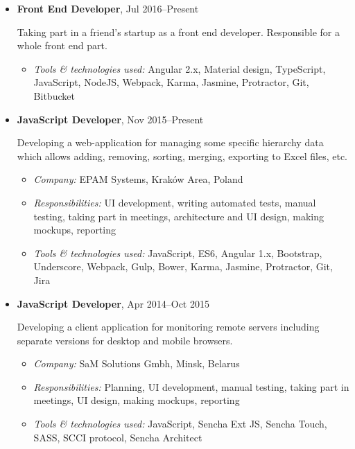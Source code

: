 \documentclass[a4paper, 12pt]{article}
\newcommand{\position}[1]{
    \textbf{#1}}
\newcommand{\itemlabel}[1]{
    \textit{#1:}}
\begin{document}
    \begin{itemize}

        \item \position{Front End Developer}, Jul 2016--Present

            Taking part in a friend's startup as a front end developer. Responsible for a whole front end part.

            \begin{itemize}
                \item \itemlabel{Tools \& technologies used} Angular 2.x, Material design, TypeScript, JavaScript, NodeJS, Webpack, Karma, Jasmine, Protractor, Git, Bitbucket
            \end{itemize}

        \item \position{JavaScript Developer}, Nov 2015--Present

            Developing a web-application for managing some specific hierarchy data which allows adding, removing, sorting, merging, exporting to Excel files, etc.

            \begin{itemize}
                \item \itemlabel{Company} EPAM Systems, Kraków Area, Poland
                \item \itemlabel{Responsibilities} UI development, writing automated tests, manual testing, taking part in meetings, architecture and UI design, making mockups, reporting
                \item \itemlabel{Tools \& technologies used} JavaScript, ES6, Angular 1.x, Bootstrap, Underscore, Webpack, Gulp, Bower, Karma, Jasmine, Protractor, Git, Jira
            \end{itemize}

        \item \position{JavaScript Developer}, Apr 2014--Oct 2015

            Developing a client application for monitoring remote servers including separate versions for desktop and mobile browsers.

            \begin{itemize}
                \item \itemlabel{Company} SaM Solutions Gmbh, Minsk, Belarus
                \item \itemlabel{Responsibilities} Planning, UI development, manual testing, taking part in meetings, UI design, making mockups, reporting
                \item \itemlabel{Tools \& technologies used} JavaScript, Sencha Ext JS, Sencha Touch, SASS, SCCI protocol, Sencha Architect
            \end{itemize}


\end{itemize}
\end{document}
